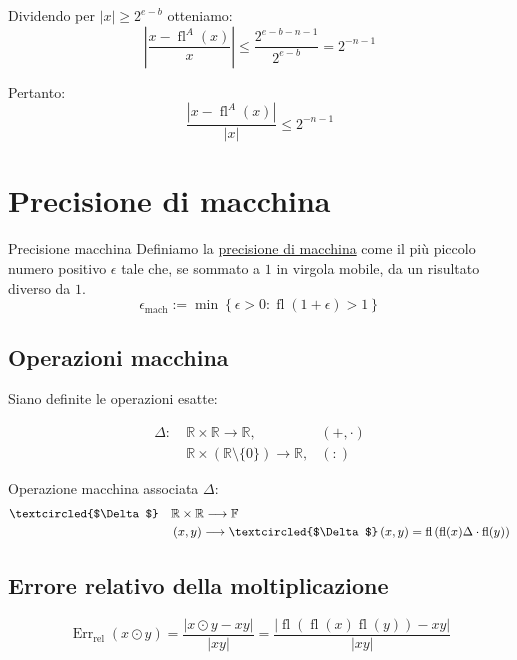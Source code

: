 \documentclass{article}
\begin{document}
Dividendo per $|x|\ge2^{e-b}$ otteniamo:
$$
    \left|\frac{x-\operatorname{fl}^{A}(x)}{x}\right|\le\frac{2^{e-b-n-1}}{2^{e-b}}=2^{-n-1}
$$

Pertanto:
$$
    \boxed{\frac{\left|x-\operatorname{fl}^{A}(x)\right|}{\left|x\right|}\le2^{-n-1}}
$$

\section{Precisione di macchina}
\begin{defi}{Precisione macchina}{}
    Definiamo la \underline{precisione di macchina} come il più piccolo numero positivo $\epsilon$ tale che, se sommato a $1$ in virgola mobile, da un risultato diverso da $1$.
    $$
        \epsilon_{\mathrm{mach}}
        :=
        \min
        \left\{
        \epsilon>0:
        \operatorname{fl}(1+\epsilon)>1
        \right\}
    $$
\end{defi}

\subsection{Operazioni macchina}

Siano definite le operazioni esatte:

\begin{align*}
    \Delta:\  & \mathbb{R}\times\mathbb{R}\longrightarrow\mathbb{R},                 & (+,\cdot) \\
              & \mathbb{R}\times(\mathbb{R}\setminus\{0\})\longrightarrow\mathbb{R}, & (:)
\end{align*}

Operazione macchina associata \textcircled{$\Delta$}:
\begin{align*}
    \textcircled{$\Delta$}\quad & \mathbb{R}\times\mathbb{R}\longrightarrow\mathbb{F}                                                                                                      \\
                                & \left(x,y\right)\longrightarrow\textcircled{$\Delta$}\left(x,y\right)=\operatorname{fl}\left(\operatorname{fl}(x)\Delta\cdot \operatorname{fl}(y)\right)
\end{align*}

\subsection{Errore relativo della moltiplicazione}

$$
    \boxed{
        \operatorname{Err}_{\mathrm{rel}}(x\odot y)
        =
        \frac{
            |x\odot y-xy|
        }{
            |xy|
        }
        =
        \frac{
            \left|
            \operatorname{fl}
            \left(
            \operatorname{fl}(x)\operatorname{fl}(y)
            \right)
            -
            xy
            \right|
        }{
            |xy|
        }}
$$
\end{document}
